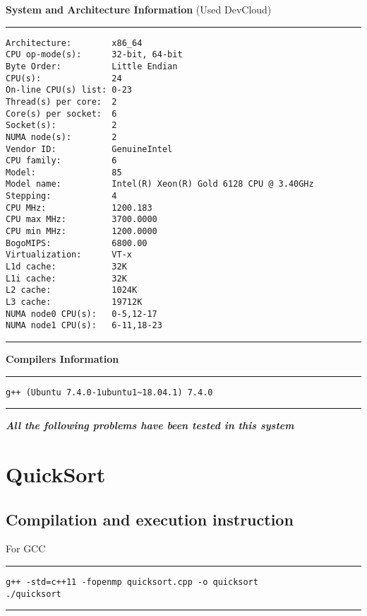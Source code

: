 \documentclass[a4paper]{article}
\begin{document}
\newpage

{\Large\bf System and Architecture Information } (Used DevCloud)
\vspace{0.5cm}
\hrule
\begin{lstlisting}
Architecture:        x86_64
CPU op-mode(s):      32-bit, 64-bit
Byte Order:          Little Endian
CPU(s):              24
On-line CPU(s) list: 0-23
Thread(s) per core:  2
Core(s) per socket:  6
Socket(s):           2
NUMA node(s):        2
Vendor ID:           GenuineIntel
CPU family:          6
Model:               85
Model name:          Intel(R) Xeon(R) Gold 6128 CPU @ 3.40GHz
Stepping:            4
CPU MHz:             1200.183
CPU max MHz:         3700.0000
CPU min MHz:         1200.0000
BogoMIPS:            6800.00
Virtualization:      VT-x
L1d cache:           32K
L1i cache:           32K
L2 cache:            1024K
L3 cache:            19712K
NUMA node0 CPU(s):   0-5,12-17
NUMA node1 CPU(s):   6-11,18-23
\end{lstlisting}
\hrule 
\vspace{0.5cm}
{\Large\bf Compilers Information } 
\vspace{0.5cm}
\hrule
\begin{lstlisting}
g++ (Ubuntu 7.4.0-1ubuntu1~18.04.1) 7.4.0
\end{lstlisting}
\hrule 
\vspace{1cm}
{\bf \emph{All the following problems have been tested in this system}}


\section{\Huge QuickSort}
\vspace{0.5cm}
\subsection{Compilation and execution instruction }
\vspace{0.3cm}
For GCC
\vspace{0.2cm}
\hrule
\begin{lstlisting}
g++ -std=c++11 -fopenmp quicksort.cpp -o quicksort
./quicksort
\end{lstlisting}
\hrule 
\vspace{0.5cm}
\end{document}
